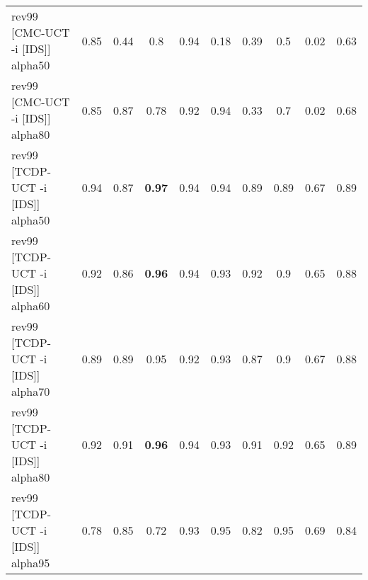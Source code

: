 \documentclass{article}
\begin{document}
\begin{tabular}{|l|r@{$\pm$}rr@{$\pm$}rr@{$\pm$}rr@{$\pm$}rr@{$\pm$}rr@{$\pm$}rr@{$\pm$}rr@{$\pm$}rr@{$\pm$}r|}
\hline
rev99 [CMC-UCT -i [IDS]] alpha50
& \multicolumn{2}{c}{0.85}
& \multicolumn{2}{c}{0.44}
& \multicolumn{2}{c}{0.8}
& \multicolumn{2}{c}{0.94}
& \multicolumn{2}{c}{0.18}
& \multicolumn{2}{c}{0.39}
& \multicolumn{2}{c}{0.5}
& \multicolumn{2}{c}{0.02}
& \multicolumn{2}{c|}{0.63}
\\
rev99 [CMC-UCT -i [IDS]] alpha80
& \multicolumn{2}{c}{0.85}
& \multicolumn{2}{c}{0.87}
& \multicolumn{2}{c}{0.78}
& \multicolumn{2}{c}{0.92}
& \multicolumn{2}{c}{0.94}
& \multicolumn{2}{c}{0.33}
& \multicolumn{2}{c}{0.7}
& \multicolumn{2}{c}{0.02}
& \multicolumn{2}{c|}{0.68}
\\
rev99 [TCDP-UCT -i [IDS]] alpha50
& \multicolumn{2}{c}{0.94}
& \multicolumn{2}{c}{0.87}
& \multicolumn{2}{c}{\textbf{0.97}}
& \multicolumn{2}{c}{0.94}
& \multicolumn{2}{c}{0.94}
& \multicolumn{2}{c}{0.89}
& \multicolumn{2}{c}{0.89}
& \multicolumn{2}{c}{0.67}
& \multicolumn{2}{c|}{0.89}
\\
rev99 [TCDP-UCT -i [IDS]] alpha60
& \multicolumn{2}{c}{0.92}
& \multicolumn{2}{c}{0.86}
& \multicolumn{2}{c}{\textbf{0.96}}
& \multicolumn{2}{c}{0.94}
& \multicolumn{2}{c}{0.93}
& \multicolumn{2}{c}{0.92}
& \multicolumn{2}{c}{0.9}
& \multicolumn{2}{c}{0.65}
& \multicolumn{2}{c|}{0.88}
\\
rev99 [TCDP-UCT -i [IDS]] alpha70
& \multicolumn{2}{c}{0.89}
& \multicolumn{2}{c}{0.89}
& \multicolumn{2}{c}{0.95}
& \multicolumn{2}{c}{0.92}
& \multicolumn{2}{c}{0.93}
& \multicolumn{2}{c}{0.87}
& \multicolumn{2}{c}{0.9}
& \multicolumn{2}{c}{0.67}
& \multicolumn{2}{c|}{0.88}
\\
rev99 [TCDP-UCT -i [IDS]] alpha80
& \multicolumn{2}{c}{0.92}
& \multicolumn{2}{c}{0.91}
& \multicolumn{2}{c}{\textbf{0.96}}
& \multicolumn{2}{c}{0.94}
& \multicolumn{2}{c}{0.93}
& \multicolumn{2}{c}{0.91}
& \multicolumn{2}{c}{0.92}
& \multicolumn{2}{c}{0.65}
& \multicolumn{2}{c|}{0.89}
\\
rev99 [TCDP-UCT -i [IDS]] alpha95
& \multicolumn{2}{c}{0.78}
& \multicolumn{2}{c}{0.85}
& \multicolumn{2}{c}{0.72}
& \multicolumn{2}{c}{0.93}
& \multicolumn{2}{c}{0.95}
& \multicolumn{2}{c}{0.82}
& \multicolumn{2}{c}{0.95}
& \multicolumn{2}{c}{0.69}
& \multicolumn{2}{c|}{0.84}
\\
\hline
\end{tabular}%

\bigskip
\end{document}

